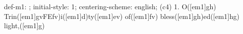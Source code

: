 def-m1: \grealign;
initial-style: 1;
centering-scheme: english;
(c4) 1. O([em1]gh) Trin([em1]gvFEfv)i([em1]d)ty([em1]ev) of([em1]fv) bless([em1]gh)ed([em1]hg) light,([em1]g)